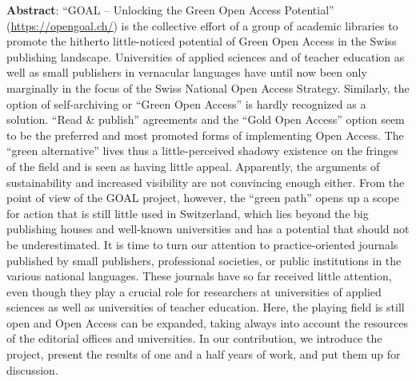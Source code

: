 \textbf{Abstract}: ``GOAL -- Unlocking the Green Open Access Potential''
(\url{https://opengoal.ch/}) is the collective effort of a group of
academic libraries to promote the hitherto little-noticed potential of
Green Open Access in the Swiss publishing landscape. Universities of
applied sciences and of teacher education as well as small publishers in
vernacular languages have until now been only marginally in the focus of
the Swiss National Open Access Strategy. Similarly, the option of
self-archiving or ``Green Open Access'' is hardly recognized as a
solution. ``Read \& publish'' agreements and the ``Gold Open Access''
option seem to be the preferred and most promoted forms of implementing
Open Access. The ``green alternative'' lives thus a little-perceived
shadowy existence on the fringes of the field and is seen as having
little appeal. Apparently, the arguments of sustainability and increased
visibility are not convincing enough either. From the point of view of
the GOAL project, however, the ``green path'' opens up a scope for
action that is still little used in Switzerland, which lies beyond the
big publishing houses and well-known universities and has a potential
that should not be underestimated. It is time to turn our attention to
practice-oriented journals published by small publishers, professional
societies, or public institutions in the various national languages.
These journals have so far received little attention, even though they
play a crucial role for researchers at universities of applied sciences
as well as universities of teacher education. Here, the playing field is
still open and Open Access can be expanded, taking always into account
the resources of the editorial offices and universities. In our
contribution, we introduce the project, present the results of one and a
half years of work, and put them up for discussion.
